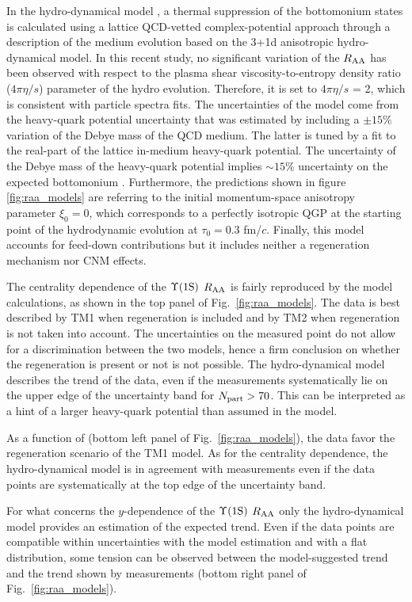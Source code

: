 In the hydro-dynamical model \cite{Krouppa:2017jlg}, a thermal suppression of the bottomonium states is calculated using a lattice QCD-vetted complex-potential approach through a description of the medium evolution based on the 3+1d anisotropic hydro-dynamical model.
 In this recent study, no significant variation of the $\mbox{$R_{\rm{AA}}$}$ has been observed with respect to the plasma shear viscosity-to-entropy density ratio ($4\pi\eta/s$) parameter of the hydro evolution. 
Therefore, it is set to $4\pi\eta/s$ = 2, which is consistent with particle spectra fits.
The uncertainties of the model come from the heavy-quark potential uncertainty that was estimated by including a $\pm 15\%$ variation of the Debye mass of the QCD medium.
The latter is tuned by a fit to the real-part of the lattice in-medium heavy-quark potential.
The uncertainty of the Debye mass of the heavy-quark potential implies $\sim15\%$ uncertainty on the expected bottomonium \raa. 
Furthermore, the predictions shown in figure \ref{fig:raa_models} are referring to the initial momentum-space anisotropy parameter $\xi_0=0$, which corresponds to a perfectly isotropic QGP at the starting point of the hydrodynamic evolution at $\tau_0=0.3$ fm/$c$.
Finally, this model accounts for feed-down contributions but it includes neither a regeneration mechanism nor CNM effects. 

The centrality dependence of the $\mbox{$\Upsilon$(1S)}$ $\mbox{$R_{\rm{AA}}$}$ is fairly reproduced by the model calculations, as shown in the top panel of Fig.~\ref{fig:raa_models}.
The data is best described by TM1 when regeneration is included and by TM2 when regeneration is not taken into account.
The uncertainties on the measured point do not allow for a discrimination between the two models, hence a firm conclusion on whether the regeneration is present or not is not possible. 
The hydro-dynamical model describes the trend of the data, even if the measurements systematically lie on the upper edge of the uncertainty band for $\mbox{$N_{\rm{part}}$}>70$.
This can be interpreted as a hint of a larger heavy-quark potential than assumed in the model.

As a function of \pt (bottom left panel of Fig.~\ref{fig:raa_models}), the data favor the regeneration scenario of the TM1 model.
As for the centrality dependence, the hydro-dynamical model is in agreement with measurements even if the data points are systematically at the top edge of the uncertainty band.

For what concerns the $y$-dependence of the $\mbox{$\Upsilon$(1S)}$ $\mbox{$R_{\rm{AA}}$}$ only the hydro-dynamical model provides an estimation of the expected trend.
Even if the data points are compatible within uncertainties with the model estimation and with a flat distribution, some tension can be observed between the model-suggested trend and the trend shown by measurements (bottom right panel of Fig.~\ref{fig:raa_models}).

